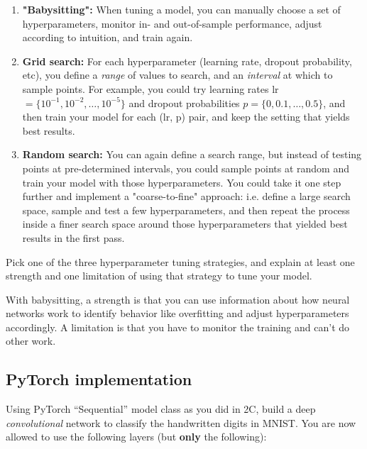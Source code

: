 \begin{enumerate}
    \item \textbf{"Babysitting":} When tuning a model, you can manually choose a set of hyperparameters, monitor in- and out-of-sample performance, adjust according to intuition, and train again.

    \item \textbf{Grid search:} For each hyperparameter (learning rate, dropout probability, etc), you define a \textit{range} of values to search, and an \textit{interval} at which to sample points. For example, you could try learning rates lr$=\{10^{-1}, 10^{-2}, \ldots, 10^{-5}\}$ and dropout probabilities $p=\{0, 0.1, \ldots, 0.5\}$, and then train your model for each (lr, p) pair, and keep the setting that yields best results.

    \item \textbf{Random search:} You can again define a search range, but instead of testing points at pre-determined intervals, you could sample points at random and train your model with those hyperparameters. You could take it one step further and implement a "coarse-to-fine" approach: i.e. define a large search space, sample and test a few hyperparameters, and then repeat the process inside a finer search space around those hyperparameters that yielded best results in the first pass.
\end{enumerate}
\problem[5] Pick one of the three hyperparameter tuning strategies, and explain at least one strength and one limitation of using that strategy to tune your model.

\begin{subsolution}
  With babysitting, a strength is that you can use information about how neural networks work to identify behavior like overfitting and adjust hyperparameters accordingly.
  A limitation is that you have to monitor the training and can't do other work.
\end{subsolution}

\subsection{PyTorch implementation}
\problem[20]

Using PyTorch ``Sequential'' model class as you did in 2C, build a deep \emph{convolutional}
network to classify the handwritten digits in MNIST. You are now allowed to use
the following layers (but \textbf{only} the following):

